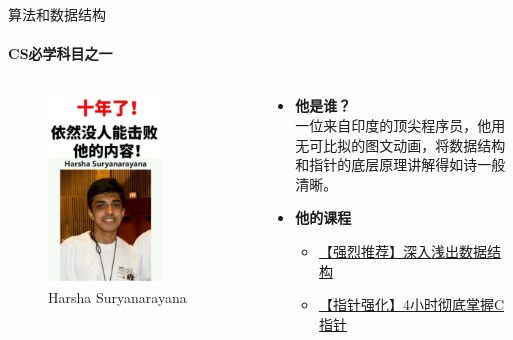 \documentclass{beamer}
\newcommand{\hrefcol}[2]{\textcolor{cyan}{\href{#1}{#2}}}
\begin{document}
\begin{frame}{算法和数据结构}
\framesubtitle{CS必学科目之一}
    \begin{columns}[T]
        \begin{column}{0.4\textwidth}
            \begin{figure}
                \includegraphics[width=0.7\textwidth]{assets/harsha.png}
                \caption{Harsha Suryanarayana}
            \end{figure}
        \end{column}
        
        \begin{column}{0.6\textwidth}
            \begin{itemize}
                \item \textbf{他是谁？} \\
                \small 一位来自印度的顶尖程序员，他用无可比拟的图文动画，将数据结构和指针的底层原理讲解得如诗一般清晰。
                
                \item  \textbf{他的课程}
                \begin{itemize}
                    \item \hrefcol{https://www.bilibili.com/video/BV1Fv4y1f7T1}{\small 【强烈推荐】深入浅出数据结构}
                    \item \hrefcol{https://www.bilibili.com/video/BV1iUypYyE7r/}{\small 【指针强化】4小时彻底掌握C指针}
                    

\end{itemize}
\end{itemize}
\end{column}
\end{columns}
\end{frame}
\end{document}
